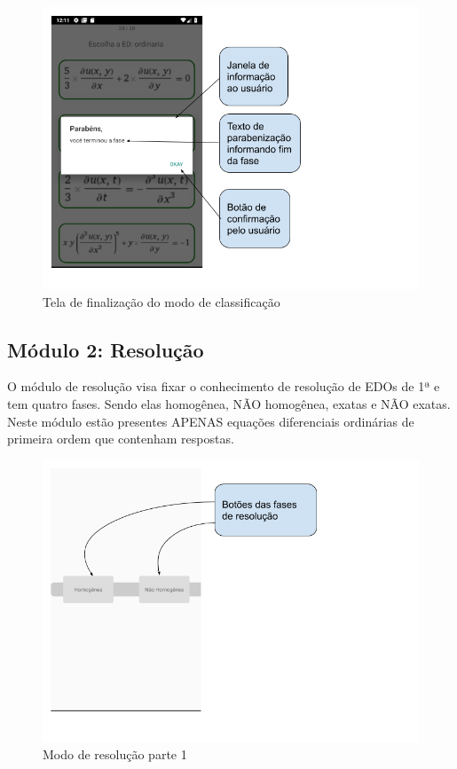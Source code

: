 \begin{figure}[H]
\centering
\caption{Tela de finalização do modo de classificação}
\includegraphics[scale=0.72]{figuras/fim_fase.png}
\end{figure}

\subsection[Módulo 2: Resolução]{Módulo 2: Resolução}

O módulo de resolução visa fixar o conhecimento de resolução de EDOs de 1ª e tem quatro fases. Sendo elas homogênea, NÃO homogênea, exatas e NÃO exatas. Neste módulo estão presentes APENAS equações diferenciais ordinárias de primeira ordem que contenham respostas. 

\begin{figure}[H]
\centering
\caption{Modo de resolução parte 1}
\includegraphics[scale=0.72]{figuras/modo_resolucao_1.png}
\end{figure}

